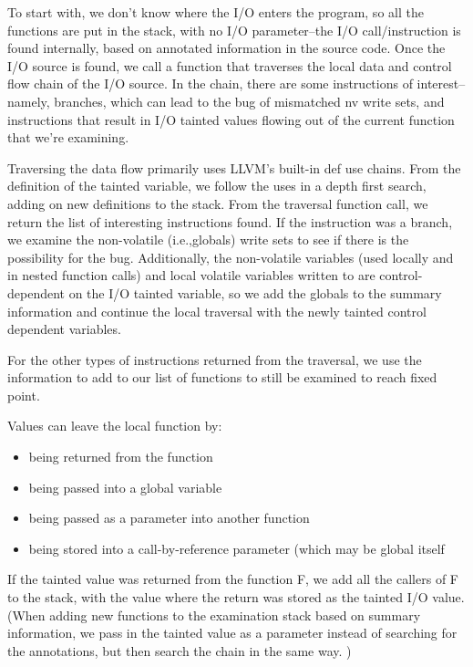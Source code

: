 To start with, we don't know where the I/O enters the program, so all the functions are put in the stack, with no I/O parameter--the I/O call/instruction is found internally, based on annotated information in the source code. Once the I/O source is found, we call a function that traverses the local data and control flow chain of the I/O source. In the chain, there are some instructions of interest--namely, branches, which can lead to the bug of mismatched nv write sets, and instructions that result in I/O tainted values flowing out of the current function that we're examining. 
	
Traversing the data flow primarily uses LLVM's built-in def use chains. From the definition of the tainted variable, we follow the uses in a depth first search, adding on new definitions to the stack.  
From the traversal function call, we return the list of interesting instructions found. If the instruction was a branch, we examine the non-volatile (i.e.,globals) write sets to see if there is the possibility for the bug. Additionally, the non-volatile variables (used locally and in nested function calls) and local volatile variables written to are control-dependent on the I/O tainted variable, so we add the globals to the summary information and continue the local traversal with the newly tainted control dependent variables.
	
For the other types of instructions returned from the traversal, we use the information to add to our list of functions to still be examined to reach fixed point. 
	
Values can leave the local function by: 
\begin{itemize}
\item{being returned from the function} 
\item{being passed into a global variable} 
\item{being passed as a parameter into another function}
\item{being stored into a call-by-reference parameter (which may be global itself}
\end{itemize}	
	
If the tainted value was returned from the function F, we add all the callers of F to the stack, with the value where the return was stored as the tainted I/O value. (When adding new functions to the examination stack based on summary information, we pass in the tainted value as a parameter instead of searching for the annotations, but then search the chain in the same way. )
	

